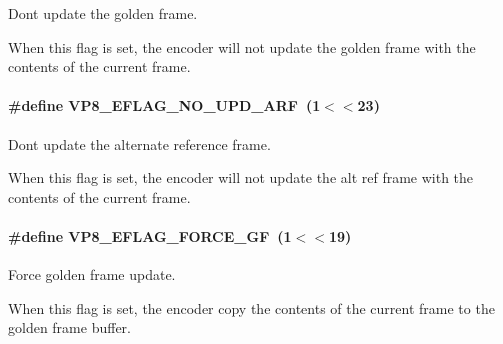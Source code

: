 Don\textquotesingle{}t update the golden frame. 

When this flag is set, the encoder will not update the golden frame with the contents of the current frame. 
\paragraph[{\texorpdfstring{V\+P8\+\_\+\+E\+F\+L\+A\+G\+\_\+\+N\+O\+\_\+\+U\+P\+D\+\_\+\+A\+RF}{VP8_EFLAG_NO_UPD_ARF}}]{\setlength{\rightskip}{0pt plus 5cm}\#define V\+P8\+\_\+\+E\+F\+L\+A\+G\+\_\+\+N\+O\+\_\+\+U\+P\+D\+\_\+\+A\+RF~(1$<$$<$23)}\hypertarget{group__vp8__encoder_ga1cff46a5287e73a620660030d40b9e6c}{}\label{group__vp8__encoder_ga1cff46a5287e73a620660030d40b9e6c}


Don\textquotesingle{}t update the alternate reference frame. 

When this flag is set, the encoder will not update the alt ref frame with the contents of the current frame. 
\paragraph[{\texorpdfstring{V\+P8\+\_\+\+E\+F\+L\+A\+G\+\_\+\+F\+O\+R\+C\+E\+\_\+\+GF}{VP8_EFLAG_FORCE_GF}}]{\setlength{\rightskip}{0pt plus 5cm}\#define V\+P8\+\_\+\+E\+F\+L\+A\+G\+\_\+\+F\+O\+R\+C\+E\+\_\+\+GF~(1$<$$<$19)}\hypertarget{group__vp8__encoder_gacb64c00adcb361f72a9a3028eb12f5ff}{}\label{group__vp8__encoder_gacb64c00adcb361f72a9a3028eb12f5ff}


Force golden frame update. 

When this flag is set, the encoder copy the contents of the current frame to the golden frame buffer. 
